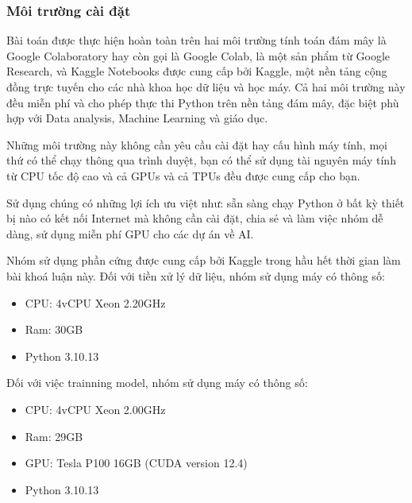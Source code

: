\subsubsection{Môi trường cài đặt}
Bài toán được thực hiện hoàn toàn trên hai môi trường tính toán đám mây là Google Colaboratory hay còn gọi là Google Colab, là một sản phẩm từ Google Research, và Kaggle Notebooks được cung cấp bởi Kaggle, một nền tảng cộng đồng trực tuyến cho các nhà khoa học dữ liệu và học máy. Cả hai môi trường này đều miễn phí và cho phép thực thi Python trên nền tảng đám mây, đặc biệt phù hợp với Data analysis, Machine Learning và giáo dục.

Những môi trường này không cần yêu cầu cài đặt hay cấu hình máy tính, mọi thứ có thể chạy thông qua trình duyệt, bạn có thể sử dụng tài nguyên máy tính từ CPU tốc độ cao và cả GPUs và cả TPUs đều được cung cấp cho bạn.

Sử dụng chúng có những lợi ích ưu việt như: sẵn sàng chạy Python ở bất kỳ thiết bị nào có kết nối Internet mà không cần cài đặt, chia sẻ và làm việc nhóm dễ dàng, sử dụng miễn phí GPU cho các dự án về AI\cite{webpage15}.

Nhóm sử dụng phần cứng được cung cấp bởi Kaggle trong hầu hết thời gian làm bài khoá luận này. Đối với tiền xử lý dữ liệu, nhóm sử dụng máy có thông số:
\begin{itemize}
    \item CPU: 4vCPU Xeon 2.20GHz
    \item Ram: 30GB
    \item Python 3.10.13
\end{itemize}
Đối với việc trainning model, nhóm sử dụng máy có thông số:
\begin{itemize}
    \item CPU: 4vCPU Xeon 2.00GHz
    \item Ram: 29GB
    \item GPU: Tesla P100 16GB (CUDA version 12.4)
    \item Python 3.10.13
\end{itemize}

